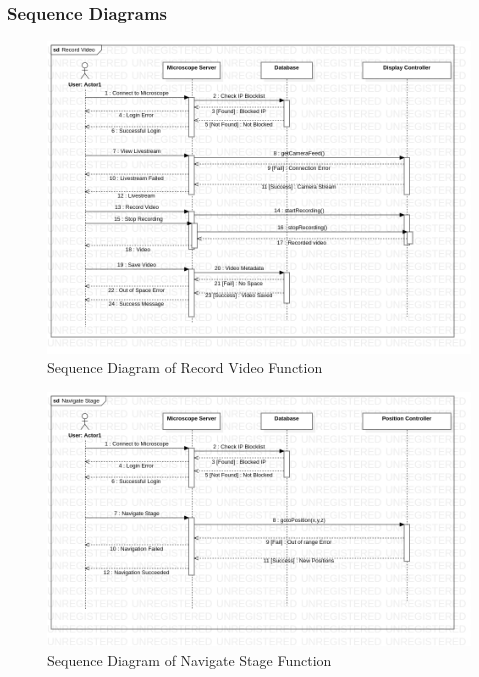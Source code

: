 \subsubsection{Sequence Diagrams}
\begin{figure}[H]
	\centering
	\includegraphics[scale=0.4]{Uml_Images/record_video_seq_diagram}
	\caption{Sequence Diagram of Record Video Function}
	\label{fig:record_video_seq_diagram}
\end{figure}
\begin{figure}[H]
	\centering
	\includegraphics[scale=0.4]{Uml_Images/navigate_stage_seq_diagram}
	\caption{Sequence Diagram of Navigate Stage Function}
	\label{fig:navigate_stage_seq_diagram}
\end{figure}
